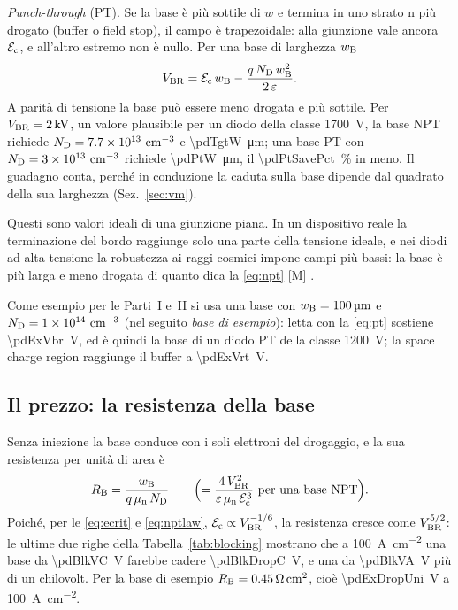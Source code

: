 \documentclass[10pt,a4paper]{scrartcl}
\let\newcommand\pdvaluedefine
\newcommand{\Ec}{\mathcal{E}_\mathrm{c}}      %
\newcommand{\ND}{N_\mathrm{D}}
\newcommand{\wB}{w_\mathrm{B}}
\newcommand{\mun}{\mu_\mathrm{n}}
\newcommand{\Vbr}{V_\mathrm{BR}}
\newcommand{\cmc}{\si{\centi\metre^{-3}}}
\begin{document}
\emph{Punch-through} (PT). Se la base è più sottile di $w$ e termina in uno strato n più drogato (buffer o field stop), il campo è trapezoidale: alla giunzione vale ancora $\Ec$, e all'altro estremo non è nullo. Per una base di larghezza $\wB$
\begin{equation}
\Vbr = \Ec\,\wB - \frac{q\,\ND\,\wB^2}{2\,\varepsilon} .
\label{eq:pt}
\end{equation}
A parità di tensione la base può essere meno drogata e più sottile. Per $\Vbr = \SI{\pdTgtV}{\kilo\volt}$, un valore plausibile per un diodo della classe \SI{1700}{\volt}, la base NPT richiede $\ND = \pdTgtNd\ \cmc$ e \SI{\pdTgtW}{\micro\metre}; una base PT con $\ND = \pdPtNd\ \cmc$ richiede \SI{\pdPtW}{\micro\metre}, il \SI{\pdPtSavePct}{\percent} in meno. Il guadagno conta, perché in conduzione la caduta sulla base dipende dal quadrato della sua larghezza (Sez.~\ref{sec:vm}).

Questi sono valori ideali di una giunzione piana. In un dispositivo reale la terminazione del bordo raggiunge solo una parte della tensione ideale, e nei diodi ad alta tensione la robustezza ai raggi cosmici impone campi più bassi: la base è più larga e meno drogata di quanto dica la \eqref{eq:npt} [M] \cite{lutz}.

Come esempio per le Parti~I e~II si usa una base con $\wB = \SI{\pdExW}{\micro\metre}$ e $\ND = \pdExNd\ \cmc$ (nel seguito \emph{base di esempio}): letta con la \eqref{eq:pt} sostiene \SI{\pdExVbr}{\volt}, ed è quindi la base di un diodo PT della classe \SI{1200}{\volt}; la space charge region raggiunge il buffer a \SI{\pdExVrt}{\volt}.

\subsection{Il prezzo: la resistenza della base}
\label{sec:unipolar}
Senza iniezione la base conduce con i soli elettroni del drogaggio, e la sua resistenza per unità di area è
\begin{equation}
R_\mathrm{B} = \frac{\wB}{q\,\mun\,\ND} \qquad \Bigl(= \frac{4\,\Vbr^2}{\varepsilon\,\mun\,\Ec^3} \ \text{per una base NPT}\Bigr) .
\label{eq:runi}
\end{equation}
Poiché, per le \eqref{eq:ecrit} e \eqref{eq:nptlaw}, $\Ec \propto \Vbr^{-1/6}$, la resistenza cresce come $\Vbr^{5/2}$: le ultime due righe della Tabella~\ref{tab:blocking} mostrano che a \SI{100}{\ampere\per\centi\metre\squared} una base da \SI{\pdBlkVC}{\volt} farebbe cadere \SI{\pdBlkDropC}{\volt}, e una da \SI{\pdBlkVA}{\volt} più di un chilovolt. Per la base di esempio $R_\mathrm{B} = \SI{0.45}{\ohm\centi\metre\squared}$, cioè \SI{\pdExDropUni}{\volt} a \SI{100}{\ampere\per\centi\metre\squared}.
\end{document}
